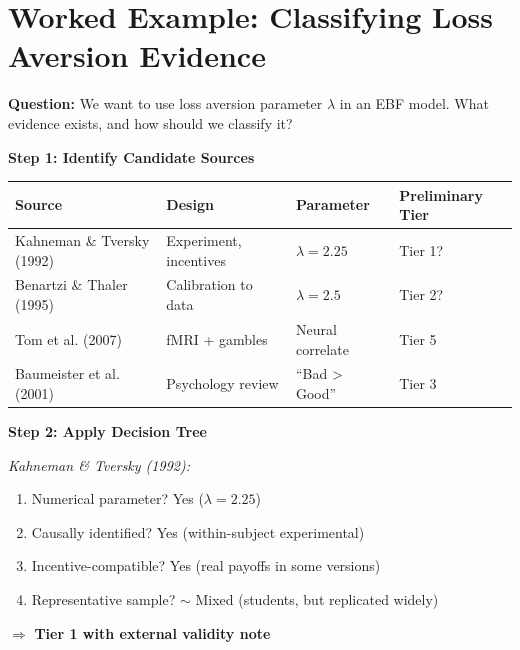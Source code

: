 \documentclass[11pt, a4paper]{article}
\begin{document}
\section{Worked Example: Classifying Loss Aversion Evidence}
\label{sec:evd-worked-example}

\begin{tcolorbox}[colback=yellow!5!white, colframe=yellow!75!black,
    title=Worked Example: How to Classify Evidence for $\lambda$ (Loss Aversion)]

\textbf{Question:} We want to use loss aversion parameter $\lambda$ in an EBF model. What evidence exists, and how should we classify it?

\textbf{Step 1: Identify Candidate Sources}

\begin{table}[htbp]
\centering
\renewcommand{\arraystretch}{1.3}
\begin{tabular}{@{}p{4cm}p{3cm}p{2cm}p{2.5cm}@{}}
\toprule
\textbf{Source} & \textbf{Design} & \textbf{Parameter} & \textbf{Preliminary Tier} \\
\midrule
Kahneman \& Tversky (1992) & Experiment, incentives & $\lambda = 2.25$ & Tier 1? \\
Benartzi \& Thaler (1995) & Calibration to data & $\lambda = 2.5$ & Tier 2? \\
Tom et al. (2007) & fMRI + gambles & Neural correlate & Tier 5 \\
Baumeister et al. (2001) & Psychology review & ``Bad > Good'' & Tier 3 \\
\bottomrule
\end{tabular}
\end{table}

\textbf{Step 2: Apply Decision Tree}

\textit{Kahneman \& Tversky (1992):}
\begin{enumerate}[nosep]
\item Numerical parameter? \checkmark Yes ($\lambda = 2.25$)
\item Causally identified? \checkmark Yes (within-subject experimental)
\item Incentive-compatible? \checkmark Yes (real payoffs in some versions)
\item Representative sample? $\sim$ Mixed (students, but replicated widely)
\end{enumerate}
$\Rightarrow$ \textbf{Tier 1 with external validity note}


\end{tcolorbox}
\end{document}
